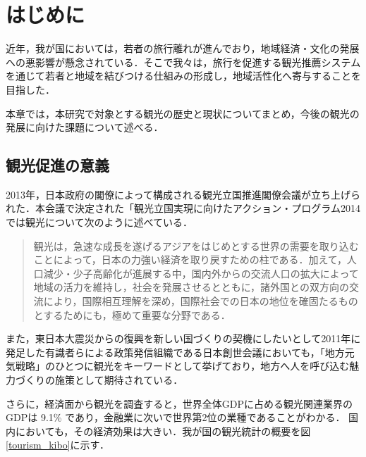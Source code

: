 \documentclass{jsarticle}
\begin{document}
\tableofcontents
\newpage
\listoftables
\newpage
\listoffigures
\newpage

\section{はじめに}

近年，我が国においては，若者の旅行離れが進んでおり，地域経済・文化の発展への悪影響が懸念されている．そこで我々は，旅行を促進する観光推薦システムを通じて若者と地域を結びつける仕組みの形成し，地域活性化へ寄与することを目指した．

本章では，本研究で対象とする観光の歴史と現状についてまとめ，今後の観光の発展に向けた課題について述べる．

\newpage

\subsection{観光促進の意義}

2013年，日本政府の閣僚によって構成される観光立国推進閣僚会議が立ち上げられた．本会議で決定された「観光立国実現に向けたアクション・プログラム2014\cite{action_program_2014}では観光について次のように述べている．

\begin{quote}
観光は，急速な成長を遂げるアジアをはじめとする世界の需要を取り込むことによって，日本の力強い経済を取り戻すための柱である．加えて，人口減少・少子高齢化が進展する中，国内外からの交流人口の拡大によって地域の活力を維持し，社会を発展させるとともに，諸外国との双方向の交流により，国際相互理解を深め，国際社会での日本の地位を確固たるものとするためにも，極めて重要な分野である．
\end{quote}

また，東日本大震災からの復興を新しい国づくりの契機にしたいとして2011年に発足した有識者らによる政策発信組織である日本創世会議においても，「地方元気戦略」のひとつに観光をキーワードとして挙げており，地方へ人を呼び込む魅力づくりの施策として期待されている\cite{nippon_sousei}．

さらに，経済面から観光を調査すると，世界全体GDPに占める観光関連業界のGDPは 9.1\% であり，金融業に次いで世界第2位の業種であることがわかる．
国内においても，その経済効果は大きい．我が国の観光統計の概要を図\ref{tourism_kibo}に示す．
\end{document}
